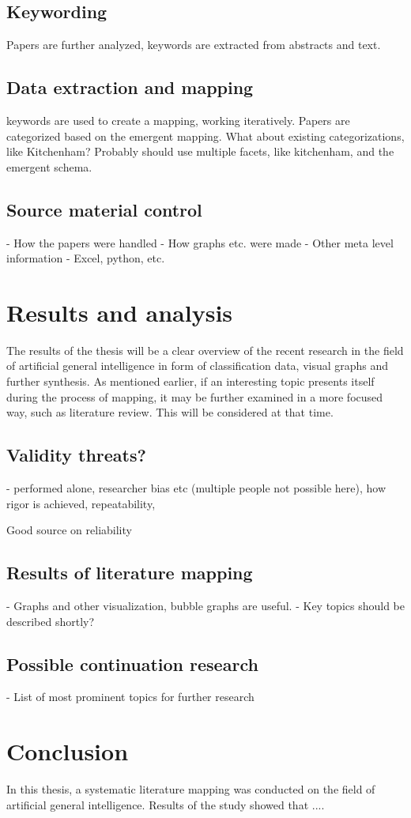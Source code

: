 \documentclass[utf8,english]{gradu3}
\begin{document}
\section{Keywording}
Papers are further analyzed, keywords are extracted from abstracts and text. 

\section{Data extraction and mapping}
keywords are used to create a mapping, working iteratively. Papers are
categorized based on the emergent mapping. What about existing categorizations,
like Kitchenham? Probably should use multiple facets, like kitchenham, and the
emergent schema.

\section{Source material control}
- How the papers were handled
- How graphs etc. were made
- Other meta level information
- Excel, python, etc.

\chapter{Results and analysis}
The results of the thesis will be a clear overview of the recent research in the
field of artificial general intelligence in form of classification data, visual
graphs and further synthesis. As mentioned earlier, if an interesting topic
presents itself during the process of mapping, it may be further examined in a
more focused way, such as literature review. This will be considered at that
time.

\section{Validity threats?}

- performed alone, researcher bias etc (multiple people not possible here),
how rigor is achieved, repeatability, 

Good source on reliability \cite{wohlin2013}

\section{Results of literature mapping}
- Graphs and other visualization, bubble graphs are useful.
- Key topics should be described shortly?

\section{Possible continuation research}

- List of most prominent topics for further research

\chapter{Conclusion}
In this thesis, a systematic literature mapping was conducted on the field of
artificial general intelligence. Results of the study showed that .... 

\printbibliography
\end{document}
